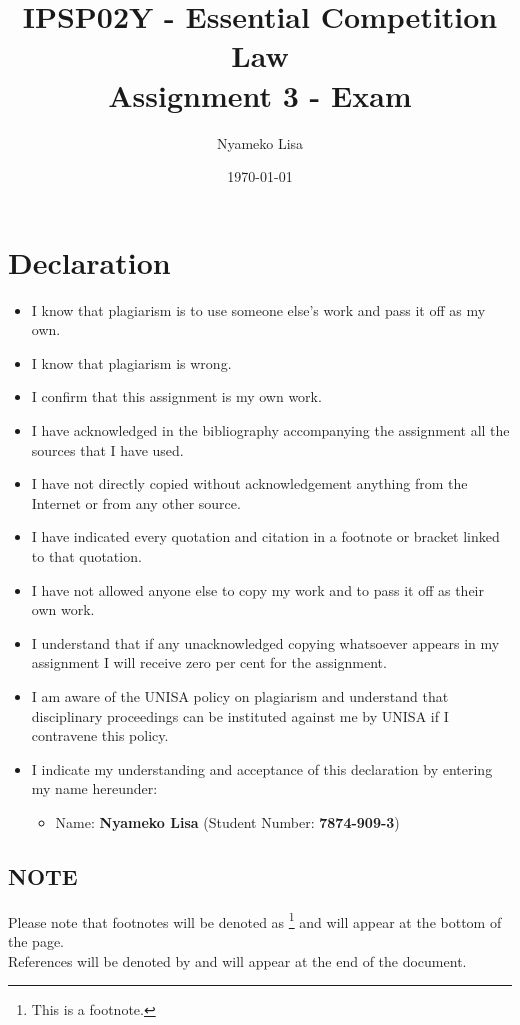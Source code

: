 \documentclass[11pt]{article}
\author{Nyameko Lisa}
\date{\today}
\title{IPSP02Y - Essential Competition Law\\\medskip
\large Assignment 3 - Exam}
\begin{document}
\maketitle
\section*{Declaration}
\label{sec:org9084cac}
\begin{itemize}
\item I know that plagiarism is to use someone else’s work and pass it off as my own.
\item I know that plagiarism is wrong.
\item I confirm that this assignment is my own work.
\item I have acknowledged in the bibliography accompanying the assignment all the sources that I have used.
\item I have not directly copied without acknowledgement anything from the Internet or from any other source.
\item I have indicated every quotation and citation in a footnote or bracket linked to that quotation.
\item I have not allowed anyone else to copy my work and to pass it off as their own work.
\item I understand that if any unacknowledged copying whatsoever appears in my assignment I will receive zero per cent for the assignment.
\item I am aware of the UNISA policy on plagiarism and understand that disciplinary proceedings can be instituted against me by UNISA if I contravene this policy.
\item I indicate my understanding and acceptance of this declaration by
entering my name hereunder:
\begin{itemize}
\item Name: \textbf{Nyameko Lisa} (Student Number: \textbf{7874-909-3})
\end{itemize}
\end{itemize}

\subsection*{NOTE}
\label{sec:org7e028ae}
Please note that footnotes will be denoted as \footnote{This is a footnote.} and will
appear at the bottom of the page.\\
References will be denoted by \cite{wipo83_paris_conve_protect_ip} and will appear at the end of the document.
\newpage
\end{document}
